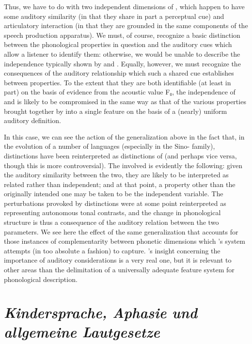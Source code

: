 Thus, we have to do with two independent dimensions of , which
happen to have some auditory similarity (in that they share in part a
perceptual cue) and articulatory interaction (in that they are
grounded in the same components of the speech production
apparatus). We must, of course, recognize a basic distinction between
the phonological properties in question and the auditory cues which
allow a listener to identify them: otherwise, we would be unable to
describe the independence typically shown by  and
. Equally, however, we must recognize the consequences of the
auditory relationship which such a shared cue establishes between
properties. To the extent that they are both identifiable (at least in
part) on the basis of evidence from the acoustic value F₀, the
independence of  and  is likely to be compromised in the
same way as that of the various properties brought together by
{\Jakobson} into a single feature on the basis of a (nearly) uniform
auditory definition.

In this case, we can see the action of the generalization above in the
fact that, in the evolution of a number of languages (especially in
the Sino- family),  distinctions have been reinterpreted
as distinctions of  (and perhaps vice versa, though this is more
controversial). The  involved is evidently the following:
given the auditory similarity between the two, they are likely to be
interpreted as related rather than independent; and at that point, a
property other than the originally intended one may be taken to be the
independent variable. The  perturbations provoked by 
distinctions were at some point reinterpreted as representing
autonomous tonal contrasts, and the change in phonological structure
is thus a consequence of the auditory relation between the two
parameters. We see here the effect of the same generalization that
accounts for those instances of complementarity between phonetic
dimensions which {\Jakobson}'s system attempts (in too absolute a
fashion) to capture. {\Jakobson}'s insight concerning the importance of
auditory considerations is a very real one, but it is relevant to
other areas than the delimitation of a universally adequate feature
system for phonological description.

\section{\textsl{Kindersprache, Aphasie und allgemeine Lautgesetze}}

